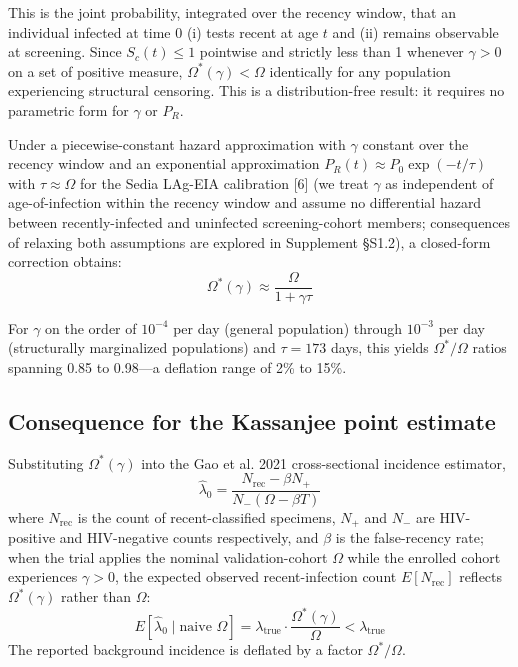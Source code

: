 \documentclass[12pt]{article}
\begin{document}
This is the joint probability, integrated over the recency window, that an individual infected at time 0 (i) tests recent at age $t$ and (ii) remains observable at screening. Since $S_c(t) \leq 1$ pointwise and strictly less than 1 whenever $\gamma > 0$ on a set of positive measure, $\Omega^*(\gamma) < \Omega$ identically for any population experiencing structural censoring. This is a distribution-free result: it requires no parametric form for $\gamma$ or $P_R$.

Under a piecewise-constant hazard approximation with $\gamma$ constant over the recency window and an exponential approximation $P_R(t) \approx P_0 \exp(-t/\tau)$ with $\tau \approx \Omega$ for the Sedia LAg-EIA calibration [6] (we treat $\gamma$ as independent of age-of-infection within the recency window and assume no differential hazard between recently-infected and uninfected screening-cohort members; consequences of relaxing both assumptions are explored in Supplement \S S1.2), a closed-form correction obtains:
\begin{equation}
\Omega^*(\gamma) \approx \frac{\Omega}{1 + \gamma\tau}
\end{equation}

For $\gamma$ on the order of $10^{-4}$ per day (general population) through $10^{-3}$ per day (structurally marginalized populations) and $\tau = 173$ days, this yields $\Omega^*/\Omega$ ratios spanning 0.85 to 0.98---a deflation range of 2\% to 15\%.

\subsection{Consequence for the Kassanjee point estimate}

Substituting $\Omega^*(\gamma)$ into the Gao et al. 2021 cross-sectional incidence estimator,
\begin{equation}
\hat{\lambda}_0 = \frac{N_{\mathrm{rec}} - \beta N_+}{N_- (\Omega - \beta T)}
\end{equation}
where $N_{\mathrm{rec}}$ is the count of recent-classified specimens, $N_+$ and $N_-$ are HIV-positive and HIV-negative counts respectively, and $\beta$ is the false-recency rate; when the trial applies the nominal validation-cohort $\Omega$ while the enrolled cohort experiences $\gamma > 0$, the expected observed recent-infection count $E[N_{\mathrm{rec}}]$ reflects $\Omega^*(\gamma)$ rather than $\Omega$:
\begin{equation}
E[\hat{\lambda}_0 \mid \text{naive } \Omega] = \lambda_{\mathrm{true}} \cdot \frac{\Omega^*(\gamma)}{\Omega} < \lambda_{\mathrm{true}}
\end{equation}
The reported background incidence is deflated by a factor $\Omega^*/\Omega$.
\end{document}
